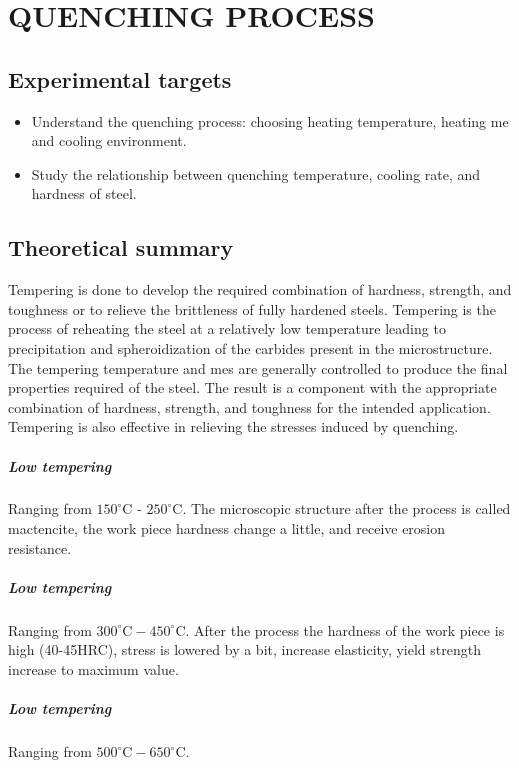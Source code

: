 \chapter{QUENCHING PROCESS}
\section{Experimental targets}
\begin{itemize}
	\item Understand  the  quenching  process:  choosing  heating  temperature,  heating  me  and  cooling environment.
	\item Study the relationship between quenching temperature, cooling rate, and hardness of steel.
\end{itemize}
\section{Theoretical summary}
Tempering is done to develop the required combination of hardness, strength, and toughness or to relieve the brittleness of fully hardened steels. Tempering is the process of reheating the steel at a relatively low temperature leading to precipitation and spheroidization of the carbides present in the microstructure. The tempering temperature and mes are generally controlled to produce the final properties required of the steel. The result is a component with the appropriate combination of hardness,  strength,  and  toughness  for  the  intended  application.  Tempering  is  also  effective  in relieving the stresses induced by quenching.
\paragraph{Low tempering} Ranging from $ 150^\circ$C - $250^\circ$C. The  microscopic  structure  after  the  process  is  called mactencite,  the  work piece  hardness  change a little, and receive erosion resistance.
\paragraph{Low tempering} Ranging from $ 300^\circ\text{C}- 450^\circ\text{C}$. After the process the hardness of the work piece is high (40-45HRC), stress is lowered by a bit, increase elasticity, yield strength increase to maximum value.
\paragraph{Low tempering} Ranging from $ 500^\circ\text{C} - 650^\circ\text{C}$.
